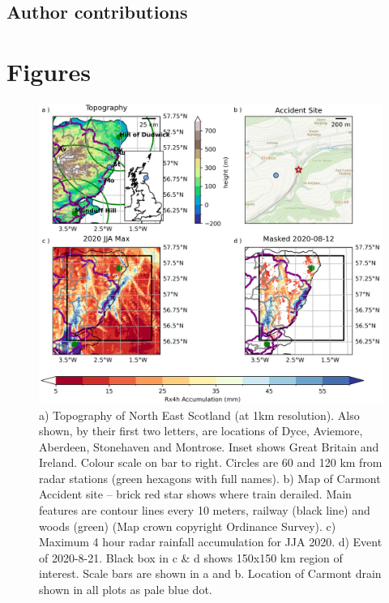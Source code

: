 \documentclass[11pt,a4paper]{article}
\begin{document}
\subsection*{Author contributions}

\clearpage





\clearpage
\section*{Figures}
\begin{figure}[ht!] %
	
	\centering
	\includegraphics[width=\linewidth]{carmont_geog_group}
	\caption{a) Topography of North East Scotland (at 1km resolution). Also shown, by their first two letters, are locations of Dyce, Aviemore, Aberdeen, Stonehaven and Montrose. Inset shows Great Britain and Ireland. Colour scale on bar to right. Circles are  60 and 120 km from radar stations (green hexagons with full names). b)  Map of Carmont Accident site -- brick red star shows where train derailed. Main features are contour lines every 10 meters, railway (black line) and woods (green) (Map crown copyright Ordinance Survey).  c) Maximum 4 hour radar rainfall accumulation  for JJA 2020. d) Event of 2020-8-21.  Black box in c \& d shows 150x150 km region of interest. Scale bars are shown in a and b. Location of Carmont drain shown in all plots as pale blue dot.  }
	\label{fig:carmont_geog_group}
\end{figure}
\end{document}
